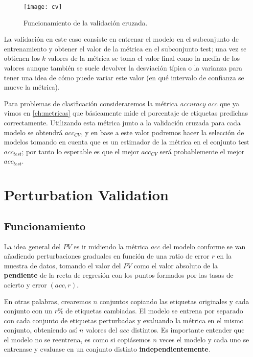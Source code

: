 \begin{figure}[htbp]
  \centering
  \texttt{[image: cv]}
  \caption{Funcionamiento de la validación cruzada.}
  \label{fig:cv}
\end{figure}

La validación en este caso consiste en entrenar el modelo en el subconjunto de entrenamiento y obtener el valor de la métrica en el subconjunto test; una vez se obtienen los $k$ valores de la métrica se toma el valor final como la media de los valores aunque también se suele devolver la desviación típica o la varianza para tener una idea de cómo puede variar este valor (en qué intervalo de confianza se mueve la métrica).

Para problemas de clasificación consideraremos la métrica \emph{accuracy} $acc$ que ya vimos en \autoref{ch:metricas} que básicamente mide el porcentaje de etiquetas predichas correctamente. Utilizando esta métrica junto a la validación cruzada para cada modelo se obtendrá $acc_{CV}$, y en base a este valor podremos hacer la selección de modelos tomando en cuenta que es un estimador de la métrica en el conjunto test $acc_{test}$; por tanto lo esperable es que el mejor $acc_{CV}$ será probablemente el mejor $acc_{test}$.

\section{Perturbation Validation}

\subsection{Funcionamiento}

La idea general del $PV$ es ir midiendo la métrica $acc$ del modelo conforme se van añadiendo perturbaciones graduales en función de una ratio de error $r$ en la muestra de datos, tomando el valor del $PV$ como el valor absoluto de la \textbf{pendiente} de la recta de regresión con los puntos formados por las tasas de acierto y error $(acc, r)$.

En otras palabras, crearemos $n$ conjuntos copiando las etiquetas originales y cada conjunto con un $r$\% de etiquetas cambiadas. El modelo se entrena por separado con cada conjunto de etiquetas perturbadas y evaluando la métrica en el mismo conjunto, obteniendo así $n$ valores del $acc$ distintos. Es importante entender que el modelo no se reentrena, es como si copiásemos $n$ veces el modelo y cada uno se entrenase y evaluase en un conjunto distinto \textbf{independientemente}.

